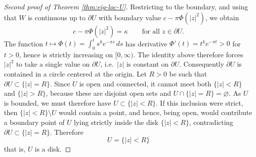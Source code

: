 \begin{proof}[Second proof of Theorem \ref{thm:eig-loc-U}]
Restricting to the boundary, and using that \(W\) is continuous up to \(\partial U\) with
boundary value \(c-\pi\Phi(|z|^2)\), we obtain
\[
c-\pi\Phi(|z|^2)=\kappa
\qquad\text{for all }z\in\partial U.
\]
The function \(t\mapsto \Phi(t)=\int_0^t s^k e^{-\pi s}\,ds\) has derivative
\(\Phi'(t)=t^k e^{-\pi t}>0\) for \(t>0\), hence is strictly increasing on \([0,\infty)\). The
identity above therefore forces \(|z|^2\) to take a single value on \(\partial U\), i.e.\ \(|z|\)
is constant on \(\partial U\). Consequently \(\partial U\) is contained in a circle centered at
the origin. Let \(R>0\) be such that
\(\partial U\subset \{|z|=R\}\). Since \(U\) is open and connected, it cannot meet both
\(\{|z|<R\}\) and \(\{|z|>R\}\), because these are disjoint open sets and \(U\cap \{|z|=R\}=\varnothing\).
As \(U\) is bounded, we must therefore have \(U\subset \{|z|<R\}\). If this inclusion were strict,
then \(\{|z|<R\}\setminus U\) would contain a point, and hence, being open, would contribute a
boundary point of \(U\) lying strictly inside the disk \(\{|z|<R\}\), contradicting
\(\partial U\subset \{|z|=R\}\). Therefore
\[
U=\{|z|<R\}
\]
that is, \(U\) is a disk.
\end{proof}

